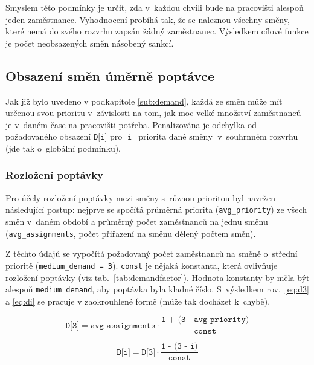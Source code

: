 \documentclass[twoside]{ctuthesis}
\begin{document}
Smyslem této podmínky je určit, zda v~každou chvíli bude na pracovišti alespoň jeden zaměstnanec. Vyhodnocení probíhá tak, že se naleznou všechny směny, které nemá do svého rozvrhu zapsán žádný zaměstnanec. Výsledkem cílové funkce je počet neobsazených směn násobený sankcí.

\subsection{Obsazení směn úměrně poptávce}
Jak již bylo uvedeno v podkapitole \ref{sub:demand}, každá ze směn může mít určenou svou prioritu v~závislosti na tom, jak moc velké množství zaměstnanců je v~daném čase na pracovišti potřeba. Penalizována je odchylka od požadovaného obsazení $\texttt{D[i]}$ pro $\texttt{i} = \mbox{priorita dané směny}$ v~souhrnném rozvrhu (jde tak o~globální podmínku).


\subsubsection{Rozložení poptávky}
Pro účely rozložení poptávky mezi směny s~různou prioritou byl navržen následující postup: nejprve se spočítá průměrná priorita (\texttt{avg\_priority}) ze všech směn v~daném období a průměrný počet zaměstnanců na jednu směnu (\texttt{avg\_assignments}, počet přiřazení na směnu dělený počtem směn).

Z těchto údajů se vypočítá požadovaný počet zaměstnanců na směně o~střední prioritě (\texttt{medium\_demand = 3}). \texttt{const} je nějaká konstanta, která ovlivňuje rozložení poptávky (viz tab.~\ref{tab:demandfactor}). Hodnota konstanty by měla být alespoň \texttt{medium\_demand}, aby poptávka byla kladné číslo. S~výsledkem rov.~\ref{eq:d3} a \ref{eq:di} se pracuje v zaokrouhlené formě (může tak docházet k~chybě).

\begin{equation}
	\label{eq:d3}
	\texttt{D[3]} = \texttt{avg\_assignments} \cdot \frac{\texttt{1 + (3 - avg\_priority})}{\texttt{const}}
\end{equation}

\begin{equation}
	\label{eq:di}
	\texttt{D[i]} = \texttt{D[3]} \cdot \frac{\texttt{1 - (3 - i})}{\texttt{const}}
\end{equation}
\end{document}

